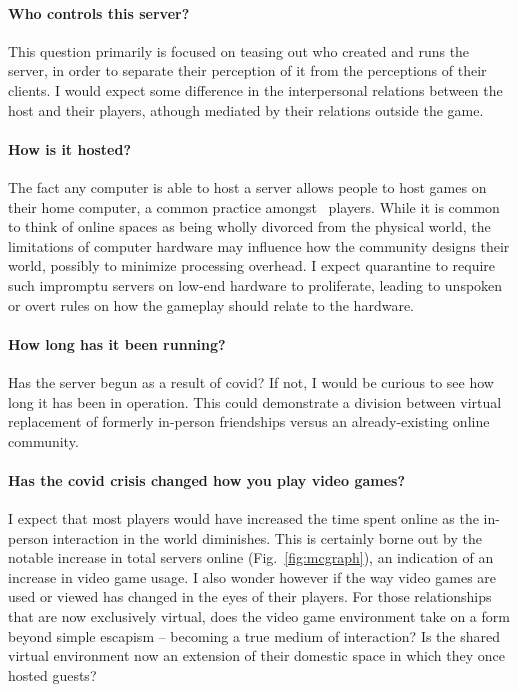 \documentclass[russian,american]{../../../coursework}
\newcommand{\mc}{\citetitle{Minecraft}}
\begin{document}
\paragraph{Who controls this server?}

This question primarily is focused on teasing out who created and runs the server,
in order to separate their perception of it from the perceptions of their clients.
I would expect some difference in the interpersonal relations between the host
and their players, athough mediated by their relations outside the game.

\paragraph{How is it hosted?}

The fact any computer is able to host a server allows people to host games on their
home computer, a common practice amongst \mc\ players. While it is common to think
of online spaces as being wholly divorced from the physical world, the limitations
of computer hardware may influence how the community designs their world, possibly
to minimize processing overhead. I expect quarantine to require such impromptu servers
on low-end hardware to proliferate, leading to unspoken or overt rules on how the
gameplay should relate to the hardware.

\paragraph{How long has it been running?}

Has the server begun as a result of \ac{covid}? If not, I would be curious to see
how long it has been in operation. This could demonstrate a division between
virtual replacement of formerly in-person friendships versus an already-existing
online community.

\paragraph{Has the \ac{covid} crisis changed how you play video games?}

I expect that most players would have increased the time spent online as
the in-person interaction in the world diminishes. This is certainly borne out
by the notable increase in total servers online (Fig.~\ref{fig:mcgraph}), an
indication of an increase in video game usage. I also wonder however if the way
video games are used or viewed has changed in the eyes of their players. For
those relationships that are now exclusively virtual, does the video game environment
take on a form beyond simple escapism -- becoming a true medium of interaction?
Is the shared virtual environment now an extension of their domestic space
in which they once hosted guests?
\end{document}
